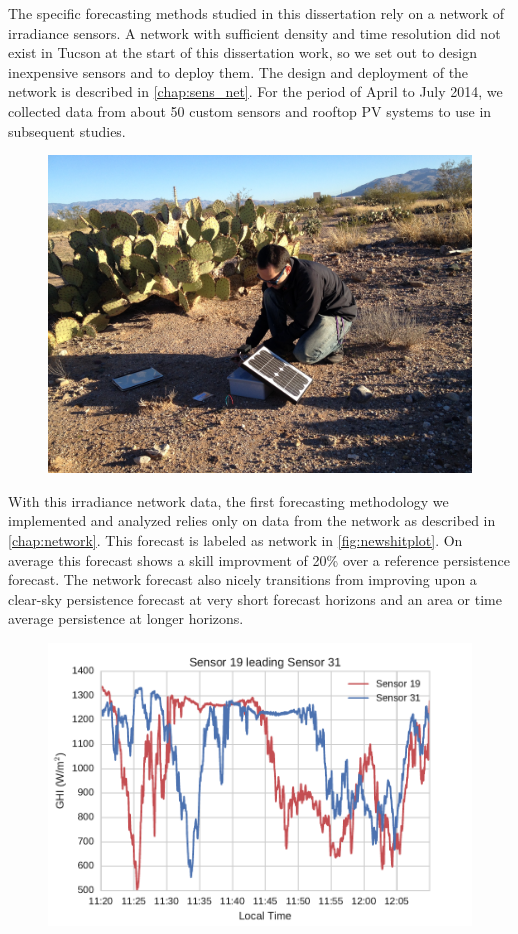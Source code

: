 The specific forecasting methods studied in this dissertation rely on
a network of irradiance sensors.
A network with sufficient density and time resolution did not exist in
Tucson at the start of this dissertation work, so we set out to design
inexpensive sensors and to deploy them.
The design and deployment of the network is described in
\cref{chap:sens_net}.
For the period of April to July 2014, we collected data from about 50
custom sensors and rooftop PV systems to use in subsequent studies.

\begin{figure}[h]
\includegraphics[width=\textwidth]{figs/sensdeploy.jpg}
\end{figure}


With this irradiance network data, the first forecasting methodology
we implemented and analyzed relies only on data from the network as
described in \cref{chap:network}.
This forecast is labeled as network in \cref{fig:newshitplot}.
On average this forecast shows a skill improvment of 20\% over a
reference persistence forecast.
The network forecast also nicely transitions from improving upon a
clear-sky persistence forecast at very short forecast horizons and an
area or time average persistence at longer horizons.

\begin{figure}[h]
\includegraphics[width=\textwidth]{figs/leading_sens.pdf}
\end{figure}

